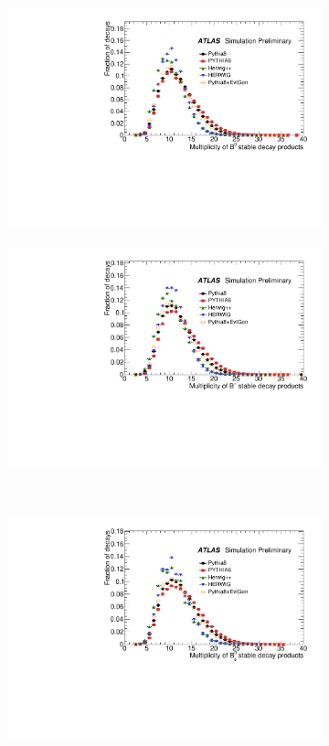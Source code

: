 \begin{figure}
\centering
\begin{subfigure}[]{0.45\textwidth}
\includegraphics[width=\textwidth]{evtgen/figures/EvtGen/B0/h_species_multiplicity.pdf}
\end{subfigure}
\begin{subfigure}[]{0.45\textwidth}
\includegraphics[width=\textwidth]{evtgen/figures/EvtGen/B+/h_species_multiplicity.pdf}
\end{subfigure}\\
\begin{subfigure}[]{0.45\textwidth}
\includegraphics[width=\textwidth]{evtgen/figures/EvtGen/Bs0/h_species_multiplicity.pdf}

\end{subfigure}
\end{figure}
